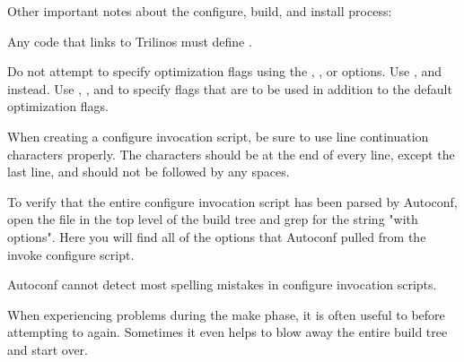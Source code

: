 Other important notes about the configure, build, and install process:
\begin{itemize}
\begin{minipage}[c]{\textwidth}
                                                                                
\begin{minipage}[l]{.6\textwidth}
                                                                                
\item Any code that links to Trilinos must define
.
\end{minipage}\hfill
{}
\end{minipage}

\item Do not attempt to specify optimization flags using the 
, , or 
 options.   Use , 
 and  instead.  Use 
, , and 
 to specify flags that are to be used in 
addition to the default optimization flags. 

\item When creating a configure invocation script, be sure to use 
line continuation characters properly.  The characters should be at the 
end of every line, except the last line, and should not be followed by any 
spaces.

\item To verify that the entire configure invocation script has been parsed by 
Autoconf, open the  file in the top level of 
the build tree and grep for the string "with options".  Here you will find all 
of the options that Autoconf pulled from the invoke configure script.

\item Autoconf cannot detect most 
spelling mistakes in configure invocation scripts.

\item When experiencing problems during the make phase, it is often useful to 
 before attempting to  again.  
Sometimes it even helps to blow away the entire build tree and start over. 


\end{itemize}
